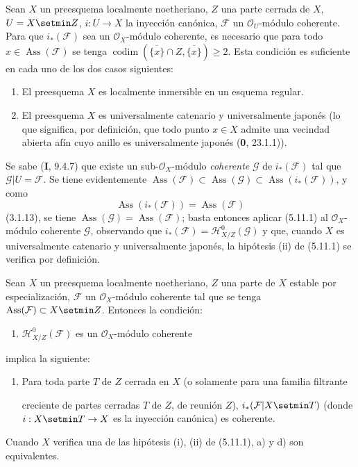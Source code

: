 \begin{corollary}[5.11.4]
Sean $X$ un preesquema localmente noetheriano, $Z$ una parte cerrada de $X$,
$U=X\setmin Z$, $i:U\to X$ la inyección canónica, $\mathcal F$ un
$\mathcal O_U$-módulo coherente. Para que $i_*(\mathcal F)$ sea un
$\mathcal O_X$-módulo coherente, es necesario que para todo
$x\in\operatorname{Ass}(\mathcal F)$ se tenga
$\operatorname{codim}(\overline{\{x\}}\cap Z,\overline{\{x\}})\geq2$.
Esta condición es suficiente en cada uno de los dos casos siguientes:
\begin{enumerate}
\item[\textup{(i)}] El preesquema $X$ es localmente inmersible en un esquema regular.
\item[\textup{(ii)}] El preesquema $X$ es universalmente catenario y universalmente
japonés \textup{(lo que significa, por definición, que todo punto $x\in X$ admite una
vecindad abierta afín cuyo anillo es} universalmente japonés \textup{(\textbf{0},
23.1.1))}.
\end{enumerate}
\end{corollary}

Se sabe (\textbf I, 9.4.7) que existe un sub-$\mathcal O_X$-módulo \emph{coherente}
$\mathcal G$ de $i_*(\mathcal F)$ tal que $\mathcal G\vert U=\mathcal F$. Se
tiene evidentemente
$\operatorname{Ass}(\mathcal F)\subset\operatorname{Ass}(\mathcal G)
\subset\operatorname{Ass}(i_*(\mathcal F))$, y como
\[
\operatorname{Ass}(i_*(\mathcal F))=\operatorname{Ass}(\mathcal F)
\]
(3.1.13), se tiene $\operatorname{Ass}(\mathcal G)=\operatorname{Ass}(\mathcal F)$;
basta entonces aplicar (5.11.1) al $\mathcal O_X$-módulo coherente
$\mathcal G$, observando que $i_*(\mathcal F)=\mathcal H^0_{X/Z}(\mathcal G)$
y que, cuando $X$ es universalmente catenario y universalmente japonés,
la hipótesis (ii) de (5.11.1) se verifica por definición.

\begin{corollary}[5.11.5]
\label{IV.2.s5.11.5-fr}
Sean $X$ un preesquema localmente noetheriano, $Z$ una parte de $X$ estable por
especialización, $\mathcal F$ un $\mathcal O_X$-módulo coherente tal que se
tenga $\operatorname{Ass}(\mathcal F)\subset X\setmin Z$. Entonces la condición:
\begin{enumerate}
\item[\textup{a)}] $\mathcal H^0_{X/Z}(\mathcal F)$ es un $\mathcal O_X$-módulo
coherente
\end{enumerate}
implica la siguiente:
\begin{enumerate}
\item[\textup{d)}] Para toda parte $T$ de $Z$ cerrada en $X$ \textup{(o solamente para una}
familia filtrante


creciente \textup{de partes cerradas $T$ de $Z$, de reunión $Z$)},
$i_*(\mathcal F\vert X\setmin T)$ (donde $i:X\setmin T\to X$ es la inyección canónica) es
coherente.
\end{enumerate}
Cuando $X$ verifica una de las hipótesis \textup{(i), (ii)} de \textup{(5.11.1), a)} y \textup{d)} son
equivalentes.
\end{corollary}

